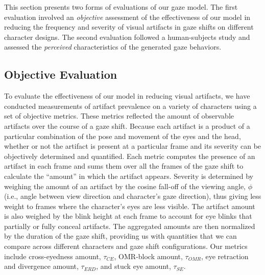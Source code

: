 This section presents two forms of evaluations of our gaze model. The first evaluation involved an \textit{objective} assessment of the effectiveness of our model in reducing the frequency and severity of visual artifacts in gaze shifts on different character designs. The second evaluation followed a human-subjects study and assessed the \textit{perceived} characteristics of the generated gaze behaviors.

\subsection{Objective Evaluation}

To evaluate the effectiveness of our model in reducing visual artifacts, we have conducted measurements of artifact prevalence on a variety of characters using a set of objective metrics. These metrics reflected the amount of observable artifacts over the course of a gaze shift. Because each artifact is a product of a particular combination of the pose and movement of the eyes and the head, whether or not the artifact is present at a particular frame and its severity can be objectively determined and quantified. Each metric computes the presence of an artifact in each frame and sums them over all the frames of the gaze shift to calculate the ``amount'' in which the artifact appears. Severity is determined by weighing the amount of an artifact by the cosine fall-off of the viewing angle, $\phi$ (i.e., angle between view direction and character's gaze direction), thus giving less weight to frames where the character's eyes are less visible. The artifact amount is also weighed by the blink height at each frame to account for eye blinks that partially or fully conceal artifacts. The aggregated amounts are then normalized by the duration of the gaze shift, providing us with quantities that we can compare across different characters and gaze shift configurations. Our metrics include cross-eyedness amount, $\tau_{CE}$, OMR-block amount, $\tau_{OMR}$, eye retraction and divergence amount, $\tau_{ERD}$, and stuck eye amount, $\tau_{SE}$.


